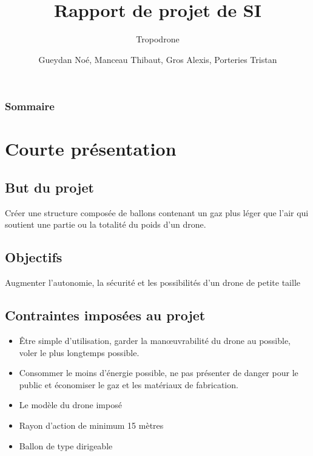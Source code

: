 \documentclass{beamer}
\title{Rapport de projet de SI}
\subtitle{Tropodrone}
\author{Gueydan Noé, Manceau Thibaut, Gros Alexis, Porteries Tristan}
\begin{document}
\begin{frame}
  \titlepage
\end{frame}

\begin{frame}
    \frametitle{Sommaire}
    \begin{multicols}{2}
      {
		\setcounter{tocdepth}{1}
        \tableofcontents
      }
    \end{multicols}
\end{frame}

\section{Courte présentation}

\subsection{But du projet}

\begin{frame}
 Créer une structure composée de ballons contenant un gaz plus léger que l’air qui soutient une partie ou la totalité du poids d'un drone.
\end{frame}


\subsection{Objectifs}

\begin{frame}
 Augmenter l’autonomie, la sécurité et les possibilités d’un drone de petite taille
\end{frame}


\subsection{Contraintes imposées au projet}
\begin{frame}
  \begin{itemize}
    \item Être simple d’utilisation, garder la manœuvrabilité du drone au possible, voler le plus longtemps possible.
    \item Consommer le moins d’énergie possible, ne pas présenter de danger pour le public et économiser le gaz et les matériaux de fabrication.
    \item Le modèle du drone imposé
    \item Rayon d’action de minimum 15 mètres
    \item Ballon de type dirigeable
  \end{itemize}
\end{frame}
\end{document}
